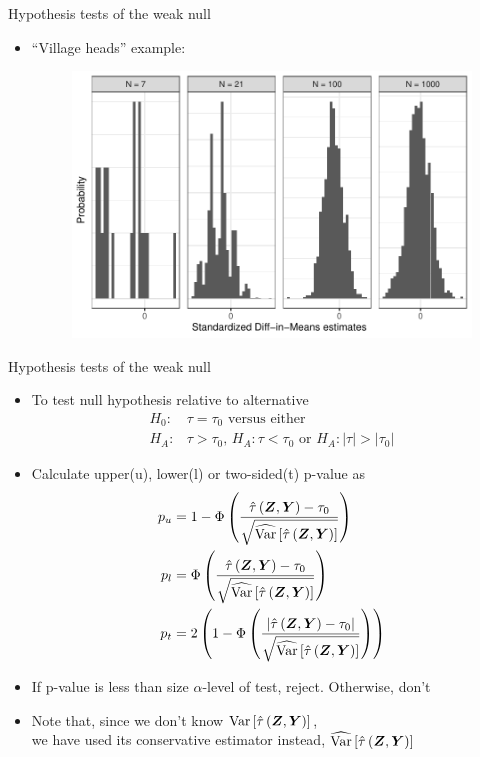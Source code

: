 \documentclass[table, xcolor = {dvipsnames}, 9pt]{beamer}
\theoremstyle{plain}
\DeclareMathOperator{\Var}{\rm{Var}}
\begin{document}
\begin{frame}{Hypothesis tests of the weak null}
\vfill
\begin{itemize} \vfill
\item ``Village heads'' example: \vfill
\begin{figure}[H]
\includegraphics[width=\linewidth]{asymp_stand_ests_plot.pdf}
\end{figure}
\end{itemize}
\vfill
\end{frame}
\begin{frame}{Hypothesis tests of the weak null}
\begin{itemize}
\item To test null hypothesis relative to alternative
\begin{align*}
H_0: & \tau = \tau_0 \text{ versus either } \\
H_A: & \tau > \tau_0, \, H_A: \tau < \tau_0 \text{ or } H_A: \left\lvert \tau \right\rvert > \left\lvert \tau_0 \right \rvert
\end{align*} \pause
\item Calculate upper(u), lower(l) or two-sided(t) p-value as 
\begin{align*}
p_u & =  1 - \Phi\left(\frac{\hat{\tau}\left(\bm{Z}, \bm{Y}\right) - \tau_0}{\sqrt{\widehat{\Var}\left[\hat{\tau}\left(\bm{Z}, \bm{Y}\right)\right]}}\right) \\
p_l & =  \Phi\left(\frac{\hat{\tau}\left(\bm{Z}, \bm{Y}\right) - \tau_0}{\sqrt{\widehat{\Var}\left[\hat{\tau}\left(\bm{Z}, \bm{Y}\right)\right]}}\right) \\
p_t & = 2\left(1 - \Phi\left(\frac{\left\lvert\hat{\tau}\left(\bm{Z}, \bm{Y}\right) - \tau_0\right\rvert}{\sqrt{\widehat{\Var}\left[\hat{\tau}\left(\bm{Z}, \bm{Y}\right)\right]}}\right)\right)
\end{align*} \pause
\item If p-value is less than size $\alpha$-level of test, reject. Otherwise, don't
\item Note that, since we don't know $\Var\left[\hat{\tau}\left(\bm{Z}, \bm{Y}\right)\right]$, \\ we have used its conservative estimator instead, $\widehat{\Var}\left[\hat{\tau}\left(\bm{Z}, \bm{Y}\right)\right]$
\end{itemize}
\end{frame}
\end{document}
